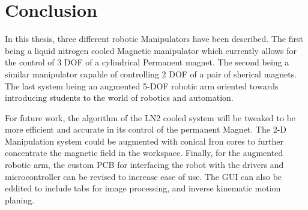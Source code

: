 
\chapter[Conclusion]{Conclusion}
\label{chap-conc}

In this thesis, three different robotic Manipulators have been described. The first being a liquid nitrogen cooled Magnetic manipulator which currently allows for the control of 3 DOF of a cylindrical Permanent magnet. The second being a similar manipulator capable of controlling 2 DOF of a pair of sherical magnets. The last system being an augmented 5-DOF robotic arm oriented towards introducing students to the world of robotics and automation. 

For future work, the algorithm of the LN2 cooled system will be tweaked to be more efficient and accurate in its control of the permanent Magnet. The 2-D Manipulation system could be augmented with conical Iron cores to further concentrate the magnetic field in the workspace. Finally, for the augmented robotic arm, the custom PCB for interfacing the robot with the drivers and microcontroller can be revised to increase ease of use. The GUI can also be eddited to include tabs for image processing, and inverse kinematic motion planing. 




